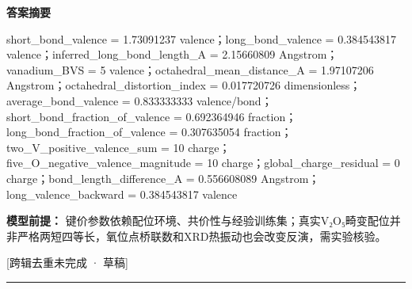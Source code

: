 \documentclass[UTF8,11pt,a4paper]{ctexart}
\begin{document}
\noindent\textbf{答案摘要}\par
short\_bond\_valence = 1.73091237 valence；long\_bond\_valence = 0.384543817 valence；inferred\_long\_bond\_length\_A = 2.15660809 Angstrom；vanadium\_BVS = 5 valence；octahedral\_mean\_distance\_A = 1.97107206 Angstrom；octahedral\_distortion\_index = 0.017720726 dimensionless；average\_bond\_valence = 0.833333333 valence/bond；short\_bond\_fraction\_of\_valence = 0.692364946 fraction；long\_bond\_fraction\_of\_valence = 0.307635054 fraction；two\_V\_positive\_valence\_sum = 10 charge；five\_O\_negative\_valence\_magnitude = 10 charge；global\_charge\_residual = 0 charge；bond\_length\_difference\_A = 0.556608089 Angstrom；long\_valence\_backward = 0.384543817 valence\par
\noindent\textbf{模型前提：}
键价参数依赖配位环境、共价性与经验训练集；真实V₂O₅畸变配位并非严格两短四等长，氧位点桥联数和XRD热振动也会改变反演，需实验核验。\par
\noindent\textcolor{red!65!black}{[跨辑去重未完成 · 草稿]} \par
\medskip\hrule\medskip
{}
\end{document}
